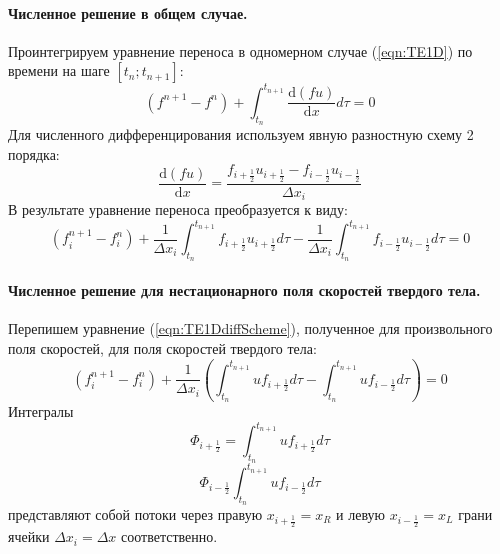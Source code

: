 \documentclass[12pt,a4paper]{article}
\begin{document}
\paragraph{Численное решение в общем случае.}
Проинтегрируем уравнение переноса в одномерном случае (\ref{eqn:TE1D}) по времени на шаге $[t_n; t_{n+1}]$:
\[
(f^{n+1}-f^n)+\int_{t_n}^{t_{n+1}}\frac{\text{d}(f u)}{\text{d}x}d\tau=0
\]
Для численного дифференцирования используем явную разностную схему 2 порядка:
\[
\frac{\text{d}(f u)}{\text{d}x}=\frac{f_{i+\frac{1}{2}}u_{i+\frac{1}{2}}-f_{i-\frac{1}{2}}u_{i-\frac{1}{2}}}{\Delta x_i}
\]
В результате уравнение переноса преобразуется к виду:
\begin{equation}
\label{eqn:TE1DdiffScheme}
(f_i^{n+1}-f_i^n)
+
\frac{1}{\Delta x_i}
\int_{t_n}^{t_{n+1}}
f_{i+\frac{1}{2}}u_{i+\frac{1}{2}}d\tau
-
\frac{1}{\Delta x_i}
\int_{t_n}^{t_{n+1}}
f_{i-\frac{1}{2}}u_{i-\frac{1}{2}} d\tau
=0
\end{equation}

\paragraph{Численное решение для нестационарного поля скоростей твердого тела.}
Перепишем уравнение (\ref{eqn:TE1DdiffScheme}), полученное для произвольного поля скоростей, для поля скоростей твердого тела:
\[
(f_i^{n+1}-f_i^n)
+
\frac{1}{\Delta x_i} (
\int_{t_n}^{t_{n+1}}
{u}f_{i+\frac{1}{2}}d\tau
-
\int_{t_n}^{t_{n+1}}
{u}f_{i-\frac{1}{2}}d\tau
)=0
\]
Интегралы
\begin{equation}
\label{eqn:FlowR}
\Phi_{i+\frac{1}{2}}=\int_{t_n}^{t_{n+1}}
{u}f_{i+\frac{1}{2}}d\tau
\end{equation}
\begin{equation}
\label{eqn:FlowL}
\Phi_{i-\frac{1}{2}}\int_{t_n}^{t_{n+1}}
{u}f_{i-\frac{1}{2}}d\tau
\end{equation}
представляют собой потоки через правую $x_{i+\frac{1}{2}}=x_R$ и левую $x_{i-\frac{1}{2}}=x_L$ грани ячейки $\Delta x_i = \Delta x$ соответственно.\\
\end{document}
